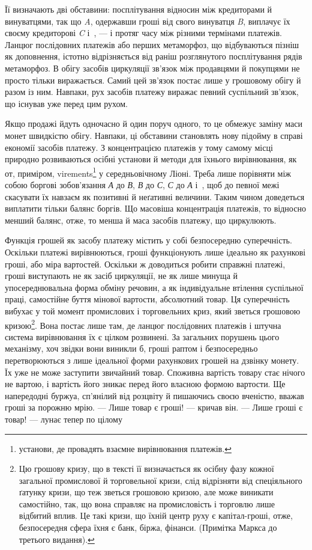 \parcont{}  %
Її визначають дві обставини: посплітування відносин між кредиторами й винуватцями,
так що \emph{A}, одержавши гроші від свого винуватця \emph{B}, виплачує їх своєму
кредиторові \emph{C} і~, — і протяг часу між різними термінами платежів.
Ланцюг послідовних платежів або перших метаморфоз, що відбуваються
пізніш як доповнення, істотно відрізняється від раніш розглянутого посплітування
рядів метаморфоз. В обігу засобів циркуляції зв’язок між продавцями й покупцями
не просто тільки виражається. Самий цей зв’язок постає лише у грошовому обігу й
разом із ним. Навпаки, рух засобів платежу виражає певний
суспільний зв’язок, що існував уже перед цим рухом.

Якщо продажі йдуть одночасно й один поруч одного, то це обмежує заміну маси монет
швидкістю обігу. Навпаки, ці обставини становлять нову підойму в справі економії
засобів платежу. З концентрацією платежів у тому самому місці природно
розвиваються осібні установи й методи для їхнього
вирівнювання, як от, приміром, virements\footnote*{
установи, де провадять взаємне вирівнювання платежів. 
} у середньовічному Ліоні. Треба лише порівняти між собою
боргові зобов’язання \emph{А} до \emph{В}, \emph{В} до \emph{С}, \emph{С} до
\emph{А} і~, щоб до певної межі скасувати їх навзаєм як
позитивні й неґативні величини. Таким чином доведеться виплатити тільки балянс
боргів. Що масовіша концентрація платежів, то відносно менший балянс, отже, то
менша й маса засобів платежу, що циркулюють.

Функція грошей як засобу платежу містить у собі безпосередню суперечність.
Оскільки платежі вирівнюються, гроші функціонують лише ідеально як рахункові
гроші, або міра вартостей. Оскільки ж
доводиться робити справжні платежі, гроші
виступають не як засіб циркуляції, не як лише минуща й упосереднювальна форма
обміну речовин, а як індивідуальне втілення суспільної праці, самостійне буття
мінової вартости, абсолютний товар. Ця суперечність вибухає у той момент
промислових і торговельних криз, який зветься грошовою кризою\footnote{
Цю грошову кризу, що в тексті її визначається як осібну фазу кожної загальної
промислової й торговельної кризи, слід відрізняти від спеціяльного ґатунку
кризи, що теж зветься грошовою кризою, але може виникати самостійно, так, що
вона справляє на промисловість і торговлю лише відбитий вплив.
Це такі кризи, що їхній центр руху є капітал-гроші, отже, безпосередня сфера
їхня є банк, біржа, фінанси. (Примітка Маркса до третього видання).
}.
Вона постає лише там, де ланцюг послідовних платежів і штучна система
вирівнювання їх є цілком розвинені. За загальних порушень цього механізму,
хоч звідки вони виникли б, гроші раптом і безпосередньо перетворюються з лише
ідеальної форми рахункових грошей на дзвінку монету. Їх уже не може заступити
звичайний товар. Споживна вартість товару стає нічого не вартою, і вартість його
зникає перед його власною формою вартости. Ще напередодні буржуа, сп’янілий
від розцвіту й пишаючись своєю вченістю, вважав гроші за порожню мрію. — Лише
товар є гроші! — кричав він. — Лише гроші є товар! — лунає тепер по цілому
\parbreak{}  %
